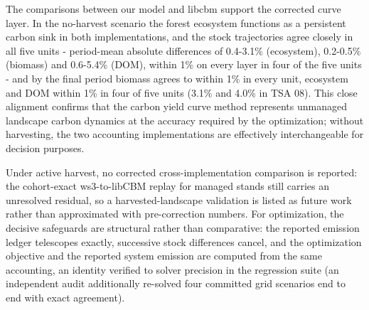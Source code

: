 \documentclass[preprint,12pt,authoryear]{elsarticle}
\begin{document}
\begin{linenumbers}
The comparisons between our model and libcbm support the corrected curve layer. In the no-harvest scenario the forest ecosystem functions as a persistent carbon sink in both implementations, and the stock trajectories agree closely in all five units - period-mean absolute differences of 0.4-3.1\% (ecosystem), 0.2-0.5\% (biomass) and 0.6-5.4\% (\ac{DOM}), within 1\% on every layer in four of the five units - and by the final period biomass agrees to within 1\% in every unit, ecosystem and \ac{DOM} within 1\% in four of five units (3.1\% and 4.0\% in TSA 08). This close alignment confirms that the carbon yield curve method represents unmanaged landscape carbon dynamics at the accuracy required by the optimization; without harvesting, the two accounting implementations are effectively interchangeable for decision purposes.

Under active harvest, no corrected cross-implementation comparison is reported: the cohort-exact ws3-to-libCBM replay for managed stands still carries an unresolved residual, so a harvested-landscape validation is listed as future work rather than approximated with pre-correction numbers. For optimization, the decisive safeguards are structural rather than comparative: the reported emission ledger telescopes exactly, successive stock differences cancel, and the optimization objective and the reported system emission are computed from the same accounting, an identity verified to solver precision in the regression suite (an independent audit additionally re-solved four committed grid scenarios end to end with exact agreement).


\end{linenumbers}
\end{document}

